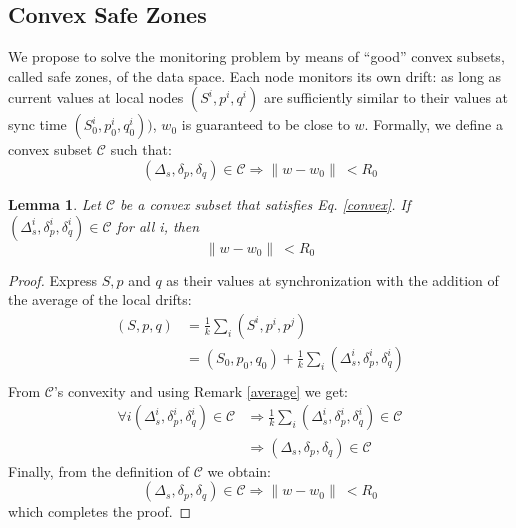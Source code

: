 \documentclass[11pt,twocolumn,varwidth=true,a4paper,fleqn]{article}
\newtheorem{lemma}{Lemma}
\begin{document}
\subsection{Convex Safe Zones}
We propose to solve the monitoring problem by means of
``good'' convex subsets, called safe zones, of the data space.
Each node monitors its own drift: as long as current values
at local nodes $(S^i,p^i,q^i)$ are sufficiently similar to their values
at sync time $(S^i_0,p^i_0,q^i_0))$, $w_0$ is guaranteed to be close to $w$.
Formally, we define a convex subset $\mathcal{C}$ such that:
\begin{equation} \label{convex}
(\Delta_s, \delta_p, \delta_q) \in \mathcal{C} \Rightarrow \parallel w-w_0
\parallel \ < R_0
\end{equation}
\begin{lemma}
Let $\mathcal{C}$ be a convex subset that satisfies Eq. \ref{convex}.
If $(\Delta_s^i, \delta_p^i, \delta_q^i) \in \mathcal{C}$ for all i, then
\begin{equation*}
\parallel w-w_0 \parallel \ < R_0
\end{equation*}
\end{lemma}
\begin{proof}
Express $S, p$ and $q$ as their values at synchronization with the addition of the
average of the local drifts:
\begin{equation*} 
\begin{split}
(S,p,q) & = \frac{1}{k} \sum_i (S^i,p^i,p^j) \\
 & = (S_0,p_0,q_0) + \frac{1}{k} \sum_i (\Delta_s^i,\delta^i_p,\delta_q^i) \\
\end{split}
\end{equation*}
From $\mathcal{C}$'s convexity and using Remark \ref{average} we get:
\begin{equation*} 
\begin{split}
\forall i (\Delta_s^i,\delta^i_p,\delta_q^i) \in \mathcal{C} & \Rightarrow 
\frac{1}{k} \sum_i (\Delta_s^i,\delta^i_p,\delta_q^i) \in \mathcal{C} \\
& \Rightarrow (\Delta_s,\delta_p,\delta_q) \in \mathcal{C}
\end{split}
\end{equation*}
Finally, from the definition of $\mathcal{C}$ we obtain:
\begin{equation*}
(\Delta_s,\delta_p,\delta_q) \in \mathcal{C} \Rightarrow \parallel w-w_0
\parallel \ < R_0
\end{equation*}
which completes the proof.
\end{proof}
\end{document}
